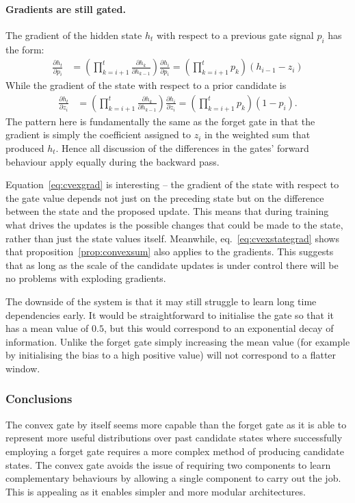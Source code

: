 \paragraph{Gradients are still gated.}
The gradient of the hidden state \(h_t\) with respect to a previous gate signal
\(p_i\) has the form:
\begin{align}
	\frac{\partial h_t}{\partial p_i} &= 
		\left(\prod_{k=i+1}^t \frac{\partial h_k}{\partial h_{k-1}}\right) 
			\frac{\partial h_i}{\partial p_i} 
	= \left( \prod_{k=i+1}^t p_k \right) (h_{i-1} - z_i) \label{eq:cvexgrad}
\end{align}
While the gradient of the state with respect to a prior candidate is
\begin{align}
	\frac{\partial h_t}{\partial z_i} &=
		\left(\prod_{k=i+1}^t \frac{\partial h_k}{\partial h_{k-1}}\right) 
			\frac{\partial h_i}{\partial z_i}
	= \left( \prod_{k=i+1}^t p_k \right) (1 - p_i). \label{eq:cvexstategrad}
\end{align} The pattern here is fundamentally the same as the forget gate in that the gradient
is simply the coefficient assigned to \(z_i\) in the weighted sum that produced \(h_t\). Hence
all discussion of the differences in the gates' forward behaviour apply equally during the
backward pass.

Equation~\eqref{eq:cvexgrad} is interesting -- the gradient of the state with respect to the gate value
depends not just on the preceding state but on the difference between the state and the proposed
update. This means that during training what drives the updates is the possible changes that could be
made to the state, rather than just the state values itself. Meanwhile, eq.~\eqref{eq:cvexstategrad}
shows that proposition~\ref{prop:convexsum} also applies to the gradients. 
This suggests that as long as the scale of the candidate updates is under control
there will be no problems with exploding gradients.

The downside of the system is that it may still struggle to learn long time dependencies early.
It would be straightforward to initialise the gate so that it has a mean value of \(0.5\),
but this would correspond to an exponential decay of information. Unlike the forget gate simply
increasing the mean value (for example by initialising the bias to a high positive value)
will not correspond to a flatter window.


\subsubsection{Conclusions}
The convex gate by itself seems more capable than the forget gate as it is able to represent more
useful distributions over past candidate states where successfully employing a forget gate requires a more
complex method of producing candidate states. The convex gate avoids the issue of requiring
two components to learn complementary behaviours by allowing a single component to carry out the job.
This is appealing as it enables simpler and more modular architectures.


